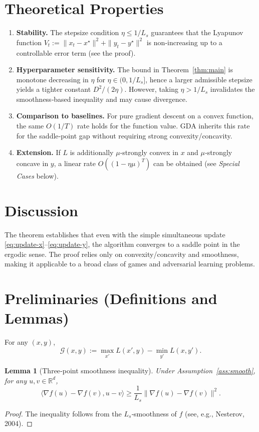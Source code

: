 \documentclass[11pt]{article}
\newtheorem{lemma}{Lemma}
\newcommand{\gap}{\mathcal{G}}
\begin{document}
\section*{Theoretical Properties}
\begin{enumerate}[label=\arabic*.]
\item \textbf{Stability.} The stepsize condition $\eta\le 1/L_{s}$ guarantees that the Lyapunov function $V_{t}:=\|x_{t}-x^{\star}\|^{2}+\|y_{t}-y^{\star}\|^{2}$ is non‑increasing up to a controllable error term (see the proof).
\item \textbf{Hyperparameter sensitivity.} The bound in Theorem~\ref{thm:main} is monotone decreasing in $\eta$ for $\eta\in(0,1/L_{s}]$, hence a larger admissible stepsize yields a tighter constant $D^{2}/(2\eta)$. However, taking $\eta>1/L_{s}$ invalidates the smoothness‑based inequality and may cause divergence.
\item \textbf{Comparison to baselines.} For pure gradient descent on a convex function, the same $O(1/T)$ rate holds for the function value. GDA inherits this rate for the saddle‑point gap without requiring strong convexity/concavity.
\item \textbf{Extension.} If $L$ is additionally $\mu$‑strongly convex in $x$ and $\mu$‑strongly concave in $y$, a linear rate $O((1-\eta\mu)^{T})$ can be obtained (see \emph{Special Cases} below).
\end{enumerate}

\section*{Discussion}
The theorem establishes that even with the simple simultaneous update \eqref{eq:update-x}–\eqref{eq:update-y}, the algorithm converges to a saddle point in the ergodic sense. The proof relies only on convexity/concavity and smoothness, making it applicable to a broad class of games and adversarial learning problems.

\newpage

\section*{Preliminaries (Definitions and Lemmas)}
\begin{definition}
For any $(x,y)$,
\[
\gap(x,y):=\max_{x'}L(x',y)-\min_{y'}L(x,y').
\]
\end{definition}
\begin{lemma}[Three‑point smoothness inequality]\label{lem:smooth}
Under Assumption~\ref{ass:smooth}, for any $u,v\in\mathbb{R}^{d}$,
\[
\langle \nabla f(u)-\nabla f(v),u-v\rangle\ge \frac{1}{L_{s}}\|\nabla f(u)-\nabla f(v)\|^{2}.
\]
\end{lemma}
\begin{proof}
The inequality follows from the $L_{s}$‑smoothness of $f$ (see, e.g., Nesterov, 2004). \hfill\qedsymbol
\end{proof}
\end{document}
